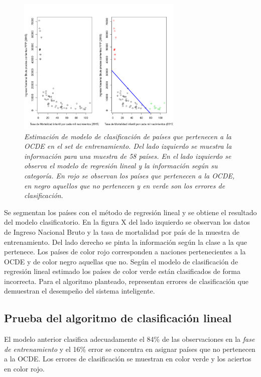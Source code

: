 \documentclass[letterpaper,12pt, spanish, oneside]{book} %
\begin{document}
\begin{figure}[H]
\centering
\includegraphics[width=0.7\textwidth]{clasificadorlinealentrenamiento.png}
\caption{\label{fig:frog2}\textit{Estimación de modelo de clasificación de países que pertenecen a la OCDE en el set de entrenamiento. Del lado izquierdo se muestra la información para una muestra de 58 países. En el lado izquierdo se observa el modelo de regresión lineal y la información según su categoría. En rojo se observan los países que pertenecen a la OCDE, en negro aquellos que no pertenecen y en verde son los errores de clasificación}.}
\end{figure}

Se segmentan los países con el método de regresión lineal y se obtiene el resultado del modelo clasificatorio. En la figura X del lado izquierdo se observan los datos de Ingreso Nacional Bruto y la tasa de mortalidad por país de la muestra de entrenamiento. Del lado derecho se pinta la información según la clase a la que pertenece. Los países de color rojo corresponden a naciones pertenecientes a la OCDE y de color negro aquellas que no. Según el modelo de clasificación de regresión lineal estimado los países de color verde están clasificados de forma incorrecta. Para el algoritmo planteado, representan errores de clasificación que demuestran el desempeño del sistema inteligente. 

\subsection{Prueba del algoritmo de clasificación lineal}


El modelo anterior clasifica adecuadamente el 84\% de las observaciones en la \textit{fase de entrenamiento} y el  16\% error se concentra en asignar países que no pertenecen a la OCDE. Los errores de clasificación se muestran en color verde y los aciertos en color rojo.
\end{document}

